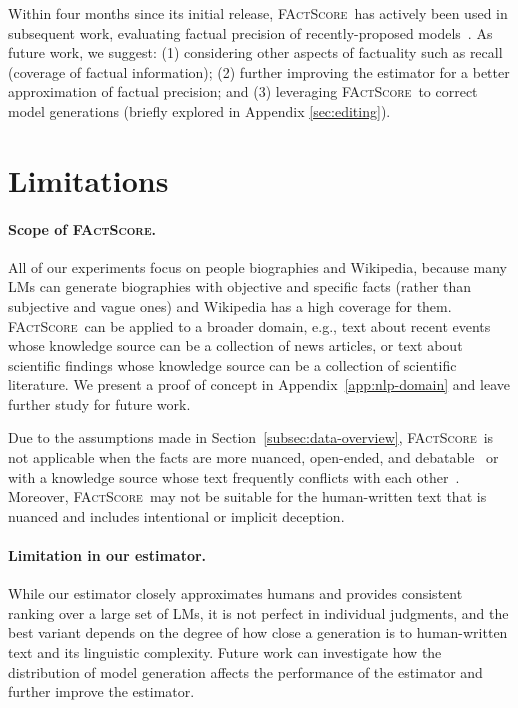 \documentclass[11pt]{article}
\newcommand{\ours}{\textsc{FActScore}}
\newcommand{\sewon}[1]{\textcolor{magenta}{[Sewon: #1]}
}
\newcommand{\kalpesh}[1]{\textcolor{brown}{[Kalpesh: #1]}
}
\begin{document}
Within four months since its initial release, \ours\ has actively been used in subsequent work, evaluating factual precision of recently-proposed models~\cite{ye2023flask,sun2023exploring,malaviya2023expertqa,dhuliawala2023chain}.
%
As future work, we suggest: (1) considering other aspects of factuality such as recall (coverage of factual information); (2) further improving the estimator for a better approximation of factual precision; and (3) leveraging \ours\ to correct model generations (briefly explored in Appendix \ref{sec:editing}).


\section*{Limitations}\label{sec:limitation}
\paragraph{Scope of \ours.}
All of our experiments focus on people biographies and Wikipedia, because many LMs can generate biographies with objective and specific facts (rather than subjective and vague ones) and Wikipedia has a high coverage for them.
\ours\ can be applied to a broader domain, e.g., text about recent events whose knowledge source can be a collection of news articles, or text about scientific findings whose knowledge source can be a collection of scientific literature.
We present a proof of concept in Appendix~\ref{app:nlp-domain} and leave further study for future work.

Due to the assumptions made in Section~\ref{subsec:data-overview},
\ours\ is not applicable when the facts are more nuanced, open-ended, and debatable~\citep{chen2019seeing,xu2023critical} or with a knowledge source whose text frequently conflicts with each other~\citep{wadden2022scifact}.
Moreover, \ours\ may not be suitable for the human-written text that is nuanced and includes intentional or implicit deception.


\vspace{-.1em}
\paragraph{Limitation in our estimator.}
While our estimator closely approximates humans and provides consistent ranking over a large set of LMs, it is not perfect in individual judgments, and the best variant depends on the degree of how close a generation is to human-written text and its linguistic complexity.
Future work can investigate how the distribution of model generation affects the performance of the estimator and further improve the estimator.
\end{document}
